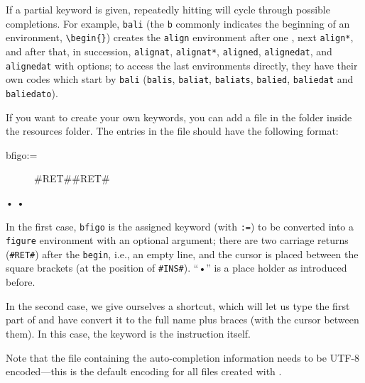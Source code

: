 If a partial keyword is given, repeatedly hitting  will cycle through possible completions. For example, \verb|bali| (the \verb|b| commonly indicates the beginning of an environment, \verb|\begin{}|) creates the \verb|align| environment after one , next \verb|align*|, and after that, in succession, \verb|alignat|, \verb|alignat*|, \verb|aligned|, \verb|alignedat|, and \verb|alignedat| with options; to access the last environments directly, they have their own codes which start by \verb|bali| (\verb|balis|, \verb|baliat|, \verb|baliats|, \verb|balied|, \verb|baliedat| and \verb|baliedato|).

If you want to create your own keywords, you can add a  file in the  folder inside the resources folder. The entries in the file should have the following format:
\begin{verbExample}
bfigo:=\begin{figure}[#INS#]#RET##RET#\end{figure}•
•
\end{verbExample}

In the first case, \verb|bfigo| is the assigned keyword (with \verb|:=|) to be converted into a \verb|figure| environment with an optional argument; there are two carriage returns (\verb|#RET#|) after the \verb|begin|, i.e., an empty line, and the cursor is placed between the square brackets (at the position of \verb|#INS#|). ``•'' is a place holder as introduced before.

In the second case, we give ourselves a shortcut, which will let us type the first part of \verb|| and have {\Tw} convert it to the full name plus braces (with the cursor between them). In this case, the keyword is the instruction itself.

Note that the  file containing the auto-completion information needs to be UTF-8 encoded---this is the default encoding for all files created with {\Tw}.